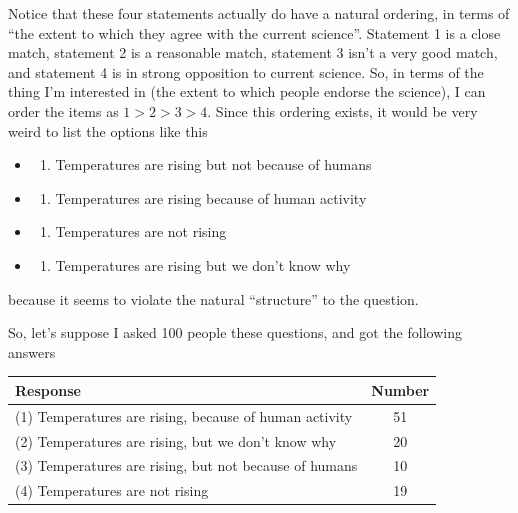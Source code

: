 \documentclass[
]{book}
\providecommand{\tightlist}{%
  \setlength{\itemsep}{0pt}\setlength{\parskip}{0pt}}
\begin{document}
Notice that these four statements actually do have a natural ordering, in terms of ``the extent to which they agree with the current science''. Statement 1 is a close match, statement 2 is a reasonable match, statement 3 isn't a very good match, and statement 4 is in strong opposition to current science. So, in terms of the thing I'm interested in (the extent to which people endorse the science), I can order the items as \(1 > 2 > 3 > 4\). Since this ordering exists, it would be very weird to list the options like this

\begin{itemize}
\item
  \begin{enumerate}
  \def\labelenumi{(\arabic{enumi})}
  \setcounter{enumi}{2}
  \tightlist
  \item
    Temperatures are rising but not because of humans
  \end{enumerate}
\item
  \begin{enumerate}
  \def\labelenumi{(\arabic{enumi})}
  \tightlist
  \item
    Temperatures are rising because of human activity
  \end{enumerate}
\item
  \begin{enumerate}
  \def\labelenumi{(\arabic{enumi})}
  \setcounter{enumi}{3}
  \tightlist
  \item
    Temperatures are not rising
  \end{enumerate}
\item
  \begin{enumerate}
  \def\labelenumi{(\arabic{enumi})}
  \setcounter{enumi}{1}
  \tightlist
  \item
    Temperatures are rising but we don't know why
  \end{enumerate}
\end{itemize}

because it seems to violate the natural ``structure'' to the question.

So, let's suppose I asked 100 people these questions, and got the following answers

\begin{longtable}[]{@{}lc@{}}
\toprule
Response & Number \\
\midrule
\endhead
(1) Temperatures are rising, because of human activity & 51 \\
(2) Temperatures are rising, but we don't know why & 20 \\
(3) Temperatures are rising, but not because of humans & 10 \\
(4) Temperatures are not rising & 19 \\
\bottomrule
\end{longtable}
\end{document}
